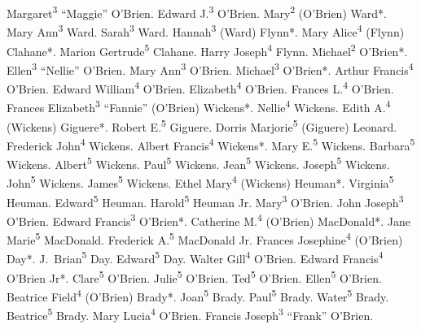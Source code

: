 Margaret\textsuperscript{3} ``Maggie'' O'Brien.
Edward J.\textsuperscript{3} O'Brien.
Mary\textsuperscript{2} (O'Brien) Ward*.
Mary Ann\textsuperscript{3} Ward.
Sarah\textsuperscript{3} Ward.
Hannah\textsuperscript{3} (Ward) Flynn*.
Mary Alice\textsuperscript{4} (Flynn) Clahane*.
Marion Gertrude\textsuperscript{5} Clahane.
Harry Joseph\textsuperscript{4} Flynn.
Michael\textsuperscript{2} O'Brien*.
Ellen\textsuperscript{3} ``Nellie'' O'Brien.
Mary Ann\textsuperscript{3} O'Brien.
Michael\textsuperscript{3} O'Brien*.
Arthur Francis\textsuperscript{4} O'Brien.
Edward William\textsuperscript{4} O'Brien.
Elizabeth\textsuperscript{4} O'Brien.
Frances L.\textsuperscript{4} O'Brien.
Frances Elizabeth\textsuperscript{3} ``Fannie'' (O'Brien) Wickens*.
Nellie\textsuperscript{4} Wickens.
Edith A.\textsuperscript{4} (Wickens) Giguere*.
Robert E.\textsuperscript{5} Giguere.
Dorris Marjorie\textsuperscript{5} (Giguere) Leonard.
Frederick John\textsuperscript{4} Wickens.
Albert Francis\textsuperscript{4} Wickens*.
Mary E.\textsuperscript{5} Wickens.
Barbara\textsuperscript{5} Wickens.
Albert\textsuperscript{5} Wickens.
Paul\textsuperscript{5} Wickens.
Jean\textsuperscript{5} Wickens.
Joseph\textsuperscript{5} Wickens.
John\textsuperscript{5} Wickens.
James\textsuperscript{5} Wickens.
Ethel Mary\textsuperscript{4} (Wickens) Heuman*.
Virginia\textsuperscript{5} Heuman.
Edward\textsuperscript{5} Heuman.
Harold\textsuperscript{5} Heuman Jr.
Mary\textsuperscript{3} O'Brien.
John Joseph\textsuperscript{3} O'Brien.
Edward Francis\textsuperscript{3} O'Brien*.
Catherine M.\textsuperscript{4} (O'Brien) MacDonald*.
Jane Marie\textsuperscript{5} MacDonald.
Frederick A.\textsuperscript{5} MacDonald Jr.
Frances Josephine\textsuperscript{4} (O'Brien) Day*.
J.\ Brian\textsuperscript{5} Day.
Edward\textsuperscript{5} Day.
Walter Gill\textsuperscript{4} O'Brien.
Edward Francis\textsuperscript{4} O'Brien Jr*.
Clare\textsuperscript{5} O'Brien.
Julie\textsuperscript{5} O'Brien.
Ted\textsuperscript{5} O'Brien.
Ellen\textsuperscript{5} O'Brien.
Beatrice Field\textsuperscript{4} (O'Brien) Brady*.
Joan\textsuperscript{5} Brady.
Paul\textsuperscript{5} Brady.
Water\textsuperscript{5} Brady.
Beatrice\textsuperscript{5} Brady.
Mary Lucia\textsuperscript{4} O'Brien.
Francis Joseph\textsuperscript{3} ``Frank'' O'Brien.

